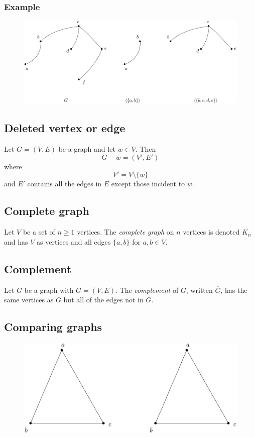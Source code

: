 \documentclass[11pt]{article}
\begin{document}
    \subsubsection{Example}

    \begin{figure}[H]
        \centering
        \includegraphics[scale=0.2]{induced.png}
    \end{figure}

    \subsection{Deleted vertex or edge}

    Let \(G = (V,E)\) be a graph and let \(w \in V\). Then \[G - w = (V', E')\] where \[V' = V \setminus \{w\}\] and $E'$ contains all the edges in $E$ except those incident to $w$.

    \subsection{Complete graph}

    Let $V$ be a set of \(n \geq 1\) vertices. The \emph{complete graph} on $n$ vertices is denoted \(K_n\) and has $V$ as vertices and all edges \(\{a,b\}\) for \(a,b \in V\).

    \subsection{Complement}

    Let $G$ be a graph with \(G = (V,E)\). The \emph{complement} of $G$, written \(\overline{G}\), has the same vertices as $G$ but all of the edges not in $G$.

    \subsection{Comparing graphs}

    \begin{figure}[H]
        \centering
        \includegraphics[scale=0.2]{triangle1.png}
    \end{figure}
\end{document}
